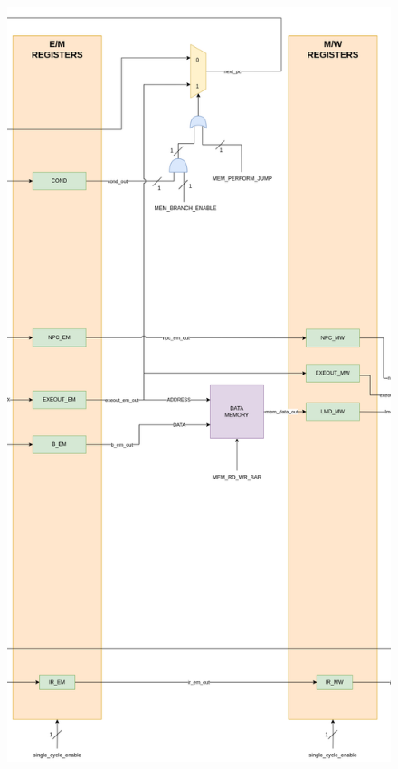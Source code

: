 \begin{figure}
\centering
\begin{minipage}{.5\textwidth}
  \centering
  \includegraphics[height=1.80\linewidth]{images/memory_stage.png}
  \label{fig:memory_stage}
\end{minipage}%
\begin{minipage}{.5\textwidth}
  \centering

\end{minipage}
\end{figure}
